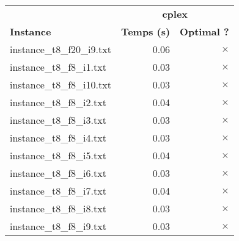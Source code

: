 \documentclass{article}
\begin{document}
\newpage
\begin{center}
\renewcommand{\arraystretch}{1.4} 
\begin{tabular}{lrr}
	\hline
 & \multicolumn{2}{c}{\textbf{cplex}}\\
\textbf{Instance}  & \textbf{Temps (s)} & \textbf{Optimal ?} \\\hline

instance\_t8\_f20\_i9.txt & 0.06 & 
$\times$
\\
instance\_t8\_f8\_i1.txt & 0.03 & 
$\times$
\\
instance\_t8\_f8\_i10.txt & 0.03 & 
$\times$
\\
instance\_t8\_f8\_i2.txt & 0.04 & 
$\times$
\\
instance\_t8\_f8\_i3.txt & 0.03 & 
$\times$
\\
instance\_t8\_f8\_i4.txt & 0.03 & 
$\times$
\\
instance\_t8\_f8\_i5.txt & 0.04 & 
$\times$
\\
instance\_t8\_f8\_i6.txt & 0.03 & 
$\times$
\\
instance\_t8\_f8\_i7.txt & 0.04 & 
$\times$
\\
instance\_t8\_f8\_i8.txt & 0.03 & 
$\times$
\\
instance\_t8\_f8\_i9.txt & 0.03 & 
$\times$
\\
\hline\end{tabular}
\end{center}
\end{document}
